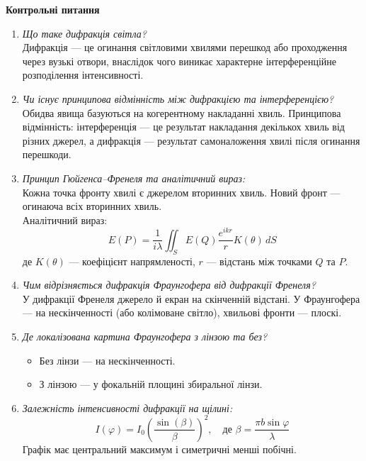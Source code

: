 \documentclass[12pt,a4paper]{article}
\begin{document}
\begin{center} \textbf{\large Контрольні питання} \end{center}

\begin{enumerate}
  \item \textit{Що таке дифракція світла?} \\
  Дифракція --- це огинання світловими хвилями перешкод або проходження через вузькі отвори, внаслідок чого виникає характерне інтерференційне розподілення інтенсивності.

  \item \textit{Чи існує принципова відмінність між дифракцією та інтерференцією?} \\
  Обидва явища базуються на когерентному накладанні хвиль. Принципова відмінність: інтерференція — це результат накладання декількох хвиль від різних джерел, а дифракція — результат самоналоження хвилі після огинання перешкоди.

  \item \textit{Принцип Гюйгенса–Френеля та аналітичний вираз:} \\
  Кожна точка фронту хвилі є джерелом вторинних хвиль. Новий фронт — огинаюча всіх вторинних хвиль. \\ 
  Аналітичний вираз: 
  \[
    E(P) = \frac{1}{i\lambda} \iint_S E(Q) \frac{e^{ikr}}{r} K(\theta)\, dS
  \]
  де $K(\theta)$ — коефіцієнт напрямленості, $r$ — відстань між точками $Q$ та $P$.

  \item \textit{Чим відрізняється дифракція Фраунгофера від дифракції Френеля?} \\
  У дифракції Френеля джерело й екран на скінченній відстані. У Фраунгофера — на нескінченності (або колімоване світло), хвильові фронти — плоскі.

  \item \textit{Де локалізована картина Фраунгофера з лінзою та без?} \\
  \begin{itemize}
    \item Без лінзи — на нескінченності.
    \item З лінзою — у фокальній площині збиральної лінзи.
  \end{itemize}

  \item \textit{Залежність інтенсивності дифракції на щілині:} \\
  \[
    I(\varphi) = I_0 \left( \frac{\sin(\beta)}{\beta} \right)^2,
    \quad \text{де } \beta = \frac{\pi b \sin \varphi}{\lambda}
  \]
  Графік має центральний максимум і симетричні менші побічні.


\end{enumerate}
\end{document}
